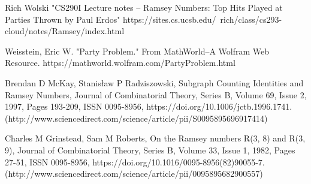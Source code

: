 \begin{thebibliography}{9}
       Rich Wolski "CS290I Lecture notes -- Ramsey Numbers: Top Hits Played at Parties Thrown by Paul Erdos" https://sites.cs.ucsb.edu/~rich/class/cs293-cloud/notes/Ramsey/index.html

 Weisstein, Eric W. "Party Problem." From MathWorld--A Wolfram Web Resource. https://mathworld.wolfram.com/PartyProblem.html 
 
 Brendan D McKay, Stanisław P Radziszowski,
Subgraph Counting Identities and Ramsey Numbers,
Journal of Combinatorial Theory, Series B,
Volume 69, Issue 2,
1997,
Pages 193-209,
ISSN 0095-8956,
https://doi.org/10.1006/jctb.1996.1741.
(http://www.sciencedirect.com/science/article/pii/S0095895696917414)

Charles M Grinstead, Sam M Roberts,
On the Ramsey numbers R(3, 8) and R(3, 9),
Journal of Combinatorial Theory, Series B,
Volume 33, Issue 1,
1982,
Pages 27-51,
ISSN 0095-8956,
https://doi.org/10.1016/0095-8956(82)90055-7.
(http://www.sciencedirect.com/science/article/pii/0095895682900557)






  \end{thebibliography}